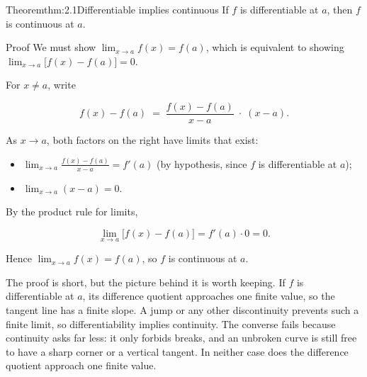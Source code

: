 \documentclass[a4paper,12pt,oneside]{memoir}
\begin{document}
\begin{envtheorem}{Theorem}{thm:2.1}{Differentiable implies continuous}
If \(f\) is differentiable at \(a\), then \(f\) is continuous at \(a\).
\end{envtheorem}
\begin{envproof}{Proof}{}{}
We must show \(\displaystyle\lim_{x \to a} f(x) = f(a)\), which is equivalent to showing \(\displaystyle\lim_{x \to a} \bigl[f(x) - f(a)\bigr] = 0\).

For \(x \ne a\), write

\[ f(x) - f(a) \;=\; \frac{f(x) - f(a)}{x - a} \;\cdot\; (x - a). \]

As \(x \to a\), both factors on the right have limits that exist:

\begin{itemize}
  \item \(\displaystyle\lim_{x \to a} \frac{f(x) - f(a)}{x - a} = f'(a)\) (by hypothesis, since \(f\) is differentiable at \(a\));
  \item \(\displaystyle\lim_{x \to a} (x - a) = 0\).
\end{itemize}
By the product rule for limits,

\[ \lim_{x \to a} \bigl[f(x) - f(a)\bigr] = f'(a) \cdot 0 = 0. \]

Hence \(\lim_{x \to a} f(x) = f(a)\), so \(f\) is continuous at \(a\).
\end{envproof}
The proof is short, but the picture behind it is worth keeping. If \(f\) is differentiable at \(a\), its difference quotient approaches one finite value, so the tangent line has a finite slope. A jump or any other discontinuity prevents such a finite limit, so differentiability implies continuity. The converse fails because continuity asks far less: it only forbids breaks, and an unbroken curve is still free to have a sharp corner or a vertical tangent. In neither case does the difference quotient approach one finite value.
\end{document}
